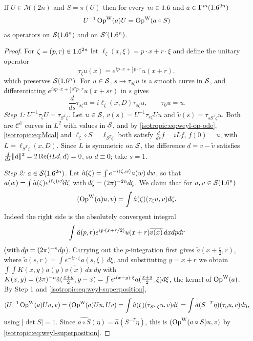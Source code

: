 \begin{theorem}\label{isotropic:thm:conjugation}
If $U\in\mathcal M(2n)$ and $S=\pi(U)$ then for every $m\in1.6$ and
$a\in\Gamma^{m}(1.6^{2n})$
\begin{equation}\label{isotropic:eq:conjugation}
  U^{-1}\operatorname{Op}^{\mathrm{W}}(a)U=\operatorname{Op}^{\mathrm{W}}(a\circ S)
\end{equation}
as operators on $\mathcal{S}(1.6^n)$ and on $\mathcal{S}'(1.6^n)$.
\end{theorem}
\begin{proof}
For $\zeta=(p,r)\in1.6^{2n}$ let $\ell_\zeta(x,\xi)=p\cdot x+r\cdot\xi$ and
define the unitary operator
\begin{equation*}
  \tau_\zeta u(x)=e^{ip\cdot x+\frac i2p\cdot r}u(x+r),
\end{equation*}
which preserves $\mathcal{S}(1.6^n)$. For $u\in\mathcal{S}$, $s\mapsto\tau_{s\zeta}u$ is a
smooth curve in $\mathcal{S}$, and differentiating
$e^{isp\cdot x+\frac i2s^2p\cdot r}u(x+sr)$ in $s$ gives
\begin{equation}\label{isotropic:eq:weyl-op-ode}
  \frac{d}{ds}\tau_{s\zeta}u=i\ell_\zeta(x,D)\tau_{s\zeta}u,\qquad\tau_0u=u .
\end{equation}
\emph{Step 1: $U^{-1}\tau_\zeta U=\tau_{S^T\zeta}$.} Let $u\in\mathcal{S}$,
$v(s)=U^{-1}\tau_{s\zeta}Uu$ and $\tilde v(s)=\tau_{sS^T\zeta}u$. Both are $\mathcal C^1$
curves in $L^2$ with values in $\mathcal{S}$, and by \eqref{isotropic:eq:weyl-op-ode},
\eqref{isotropic:eq:Mcal} and $\ell_\zeta\circ S=\ell_{S^T\zeta}$ both satisfy
$\frac{d}{ds}f=iLf$, $f(0)=u$, with $L=\ell_{S^T\zeta}(x,D)$. Since $L$ is
symmetric on $\mathcal{S}$, the difference $d=v-\tilde v$ satisfies
$\frac{d}{ds}\lVert d\rVert^2=2\operatorname{Re}(iLd,d)=0$, so $d\equiv0$; take $s=1$.

\emph{Step 2: $a\in\mathcal{S}(1.6^{2n})$.} Let
$\hat a(\zeta)=\int e^{-i\langle \zeta, w\rangle}a(w)\,dw$, so that
$a(w)=\int\hat a(\zeta)e^{i\ell_\zeta(w)}\dbar\zeta$ with
$\dbar\zeta=(2\pi)^{-2n}d\zeta$. We claim that for $u,v\in\mathcal{S}(1.6^n)$
\begin{equation}\label{isotropic:eq:weyl-superposition}
  (\OpW(a)u,v)=\int\hat a(\zeta)(\tau_\zeta u,v)\,\dbar\zeta .
\end{equation}
Indeed the right side is the absolutely convergent integral
\begin{equation*}
\int\hat a(p,r)e^{ip\cdot(x+r/2)}u(x+r)\overline{v(x)}\,dx\,\dbar p\,\dbar r
\end{equation*}
(with $\dbar p=(2\pi)^{-n}dp$). Carrying out the $p$-integration first gives
$\check a(x+\frac r2,r)$, where $\check a(s,r)=\int e^{-ir\cdot\xi}a(s,\xi)\,d\xi$,
and substituting $y=x+r$ we obtain
$\int\!\!\int K(x,y)u(y)\overline{v(x)}\,dx\,dy$ with
$K(x,y)=(2\pi)^{-n}\check a(\frac{x+y}2,y-x)=\int e^{i(x-y)\cdot\xi}a(\frac{x+y}2,\xi)\,\dbar\xi$,
the kernel of $\operatorname{Op}^{\mathrm{W}}(a)$. By Step 1 and \eqref{isotropic:eq:weyl-superposition},
\begin{equation*}
  (U^{-1}\OpW(a)Uu,v)=(\OpW(a)Uu,Uv)=\int\hat a(\zeta)(\tau_{S^T\zeta}u,v)\,\dbar\zeta
  =\int\hat a(S^{-T}\eta)(\tau_\eta u,v)\,\dbar\eta,
\end{equation*}
using $|\det S|=1$. Since $\widehat{a\circ S}(\eta)=\hat a(S^{-T}\eta)$, this is
$(\operatorname{Op}^{\mathrm{W}}(a\circ S)u,v)$ by \eqref{isotropic:eq:weyl-superposition}.


\end{proof}
